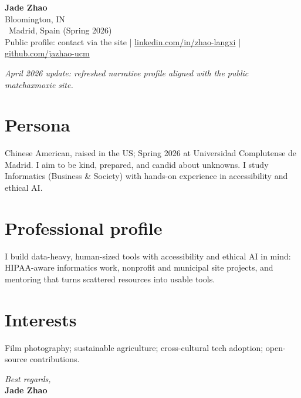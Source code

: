 \documentclass[11pt]{article}
\begin{document}
\begin{center}
    {\LARGE \textbf{Jade Zhao}}\\
    \vspace{0.25em}
    {\small Bloomington, IN \\\ Madrid, Spain (Spring 2026)}\\
    \vspace{0.25em}
    {\small
      Public profile: contact via the site
      \;|\;
      \href{https://www.linkedin.com/in/zhao-langxi/}{linkedin.com/in/zhao-langxi}
      \;|\;
      \href{https://github.com/jazhao-ucm}{github.com/jazhao-ucm}
    }
    \vspace{0.25em}
\end{center}

\noindent\textit{April 2026 update: refreshed narrative profile aligned with the public matchaxmoxie site.}

\vspace{0.75em}

\section*{Persona}
Chinese American, raised in the US; Spring 2026 at Universidad Complutense de Madrid. I aim to be kind, prepared, and candid about unknowns. I study Informatics (Business & Society) with hands-on experience in accessibility and ethical AI.

\section*{Professional profile}
I build data-heavy, human-sized tools with accessibility and ethical AI in mind: HIPAA-aware informatics work, nonprofit and municipal site projects, and mentoring that turns scattered resources into usable tools.

\section*{Interests}
Film photography; sustainable agriculture; cross-cultural tech adoption; open-source contributions.

\vspace{0.5em}
\textit{Best regards,}\\
\textbf{Jade Zhao}
\end{document}
